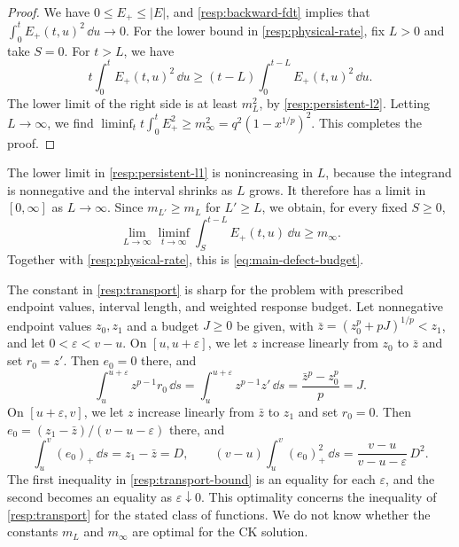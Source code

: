 \begin{proof}
We have $0\le E_+\le|E|$, and \cref{resp:backward-fdt} implies that $\int_0^tE_+(t,u)^2\,\dd u\to0$. For the lower bound in \eqref{resp:physical-rate}, fix $L>0$ and take $S=0$. For $t>L$, we have
\[
 t\int_0^tE_+(t,u)^2\,\dd u\ge(t-L)\int_0^{t-L}E_+(t,u)^2\,\dd u.
\]
The lower limit of the right side is at least $m_L^2$, by \eqref{resp:persistent-l2}. Letting $L\to\infty$, we find $\liminf_tt\int_0^tE_+^2\ge m_\infty^2=q^2(1-x^{1/p})^2$. This completes the proof.
\end{proof}

The lower limit in \eqref{resp:persistent-l1} is nonincreasing in $L$, because the integrand is nonnegative and the interval shrinks as $L$ grows. It therefore has a limit in $[0,\infty]$ as $L\to\infty$. Since $m_{L'}\ge m_L$ for $L'\ge L$, we obtain, for every fixed $S\ge0$,
\begin{equation}\label{eq:viol-iterated-l1}
 \lim_{L\to\infty}\liminf_{t\to\infty}\int_S^{t-L}E_+(t,u)\,\dd u\ge m_\infty.
\end{equation}
Together with \eqref{resp:physical-rate}, this is \eqref{eq:main-defect-budget}.

\begin{remark}\label{rem:transport-sharp}
The constant in \cref{resp:transport} is sharp for the problem with prescribed endpoint values, interval length, and weighted response budget. Let nonnegative endpoint values $z_0,z_1$ and a budget $J\ge0$ be given, with $\bar z=(z_0^p+pJ)^{1/p}<z_1$, and let $0<\varepsilon<v-u$. On $[u,u+\varepsilon]$, we let $z$ increase linearly from $z_0$ to $\bar z$ and set $r_0=z'$. Then $e_0=0$ there, and
\[
 \int_u^{u+\varepsilon}z^{p-1}r_0\,\dd s=\int_u^{u+\varepsilon}z^{p-1}z'\,\dd s=\frac{\bar z^p-z_0^p}p=J.
\]
On $[u+\varepsilon,v]$, we let $z$ increase linearly from $\bar z$ to $z_1$ and set $r_0=0$. Then $e_0=(z_1-\bar z)/(v-u-\varepsilon)$ there, and
\[
 \int_u^v(e_0)_+\,\dd s=z_1-\bar z=D,
 \qquad
 (v-u)\int_u^v(e_0)_+^2\,\dd s=\frac{v-u}{v-u-\varepsilon}\,D^2.
\]
The first inequality in \eqref{resp:transport-bound} is an equality for each $\varepsilon$, and the second becomes an equality as $\varepsilon\downarrow0$. This optimality concerns the inequality of \cref{resp:transport} for the stated class of functions. We do not know whether the constants $m_L$ and $m_\infty$ are optimal for the CK solution.
\end{remark}
